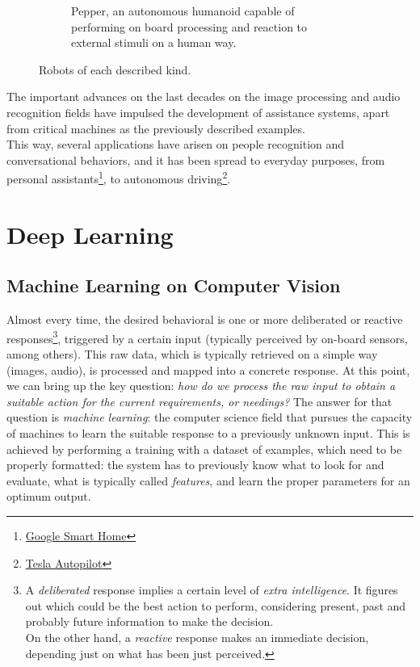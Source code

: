 \begin{figure}[h]
\begin{subfigure}[b]{0.4\textwidth}
			\caption{Pepper, an autonomous humanoid capable of performing on board processing and reaction to external stimuli on a human way.}
			\label{fig:1_pepper}
		\end{subfigure}
		\caption{Robots of each described kind.}
		\label{fig:1_robots}
		
	\end{figure}

The important advances on the last decades on the image processing and audio recognition fields have impulsed the development of assistance systems, apart from critical machines as the previously described examples. \\

This way, several applications have arisen on people recognition and conversational behaviors, and it has been spread to everyday purposes, from personal assistants\footnote{\href{https://www.standard.co.uk/tech/google-smart-home-future-stay-a3868591.html}{Google Smart Home}}, to autonomous driving\footnote{\href{https://electrek.co/2018/06/18/what-tesla-autopilot-see-understand/}{Tesla Autopilot}}.\\


\section{Deep Learning}
\subsection{Machine Learning on Computer Vision}
Almost every time, the desired behavioral is one or more deliberated or reactive responses\footnote{A \emph{deliberated} response implies a certain level of \emph{extra intelligence}. It figures out which could be the best action to perform, considering present, past and probably future information to make the decision.\\ On the other hand, a \emph{reactive} response makes an immediate decision, depending just on what has been just perceived.}, triggered by a certain input (typically perceived by on-board sensors, among others). This raw data, which is typically retrieved on a simple way (images, audio), is processed and mapped into a concrete response. At this point, we can bring up the key question: \emph{how do we process the raw input to obtain a suitable action for the current requirements, or needings?} The answer for that question is \textit{machine learning}: the computer science field that pursues the capacity of machines to learn the suitable response to a previously unknown input. This is achieved by performing a training with a dataset of examples, which need to be properly formatted: the system has to previously know what to look for and evaluate, what is typically called \textit{features}, and learn the proper parameters for an optimum output.\\


